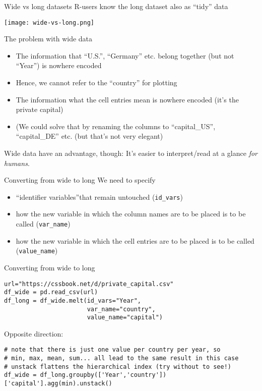 \begin{frame}{Wide vs long datasets}
R-users know the long dataset also as ``tidy'' data

\centering

\texttt{[image: wide-vs-long.png]}\hfill


\end{frame}

\begin{frame}{The problem with wide data}

  \begin{itemize}[<+->]
  \item The information that ``U.S.'', ``Germany'' etc. belong together (but not ``Year'') is nowhere encoded
  \item Hence, we cannot refer to the ``country'' for plotting
  \item The information what the cell entries mean is nowhere encoded (it's the private capital)
  \item (We could solve that by renaming the columns to ``capital\_US'', ``capital\_DE'' etc. (but that's not very elegant)
  \end{itemize}

  \pause

  Wide data have an advantage, though: It's easier to interpret/read at a glance \emph{for humans}. 

\end{frame}

\begin{frame}[fragile]{Converting from wide to long}
  We need to specify
  \begin{itemize}
  \item ``identifier variables''that remain untouched (\texttt{id\_vars})
  \item how the new variable in which the column names are to be placed is to be called (\texttt{var\_name})
  \item how the new variable in which the cell entries are to be placed is to be called (\texttt{value\_name})
  \end{itemize}
\end{frame}

\begin{frame}[fragile]{Converting from wide to long}

\begin{verbatim}
url="https://cssbook.net/d/private_capital.csv"
df_wide = pd.read_csv(url)
df_long = df_wide.melt(id_vars="Year", 
                       var_name="country", 
                       value_name="capital")
\end{verbatim}

Opposite direction:
\begin{verbatim}
# note that there is just one value per country per year, so
# min, max, mean, sum... all lead to the same result in this case
# unstack flattens the hierarchical index (try without to see!)
df_wide = df_long.groupby(['Year','country'])['capital'].agg(min).unstack()
\end{verbatim}
\end{frame}

